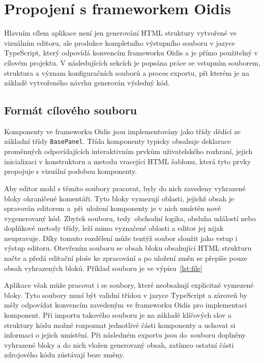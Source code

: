 \section{Propojení s frameworkem Oidis}
\label{Propojeni}

Hlavním cílem aplikace není jen generování HTML struktury vytvořené ve vizuálním editoru, ale produkce kompletního výstupního souboru v jazyce TypeScript, který odpovídá konvencím frameworku Oidis a je přímo použitelný v cílovém projektu. V následujících sekcích je popsána práce se vstupním souborem, struktura a význam konfiguračních souborů a proces exportu, při kterém je na základě vytvořeného návrhu generován výsledný kód.

\subsection{Formát cílového souboru}

Komponenty ve frameworku Oidis jsou implementovány jako třídy dědící ze základní třídy \texttt{BasePanel}. Třída komponenty typicky obsahuje deklarace proměnných odpovídajících interaktivním prvkům uživatelského rozhraní, jejich inicializaci 
v konstruktoru a metodu vracející HTML šablonu, která tyto prvky propojuje s vizuální podobou komponenty.

Aby editor mohl s těmito soubory pracovat, byly do nich zavedeny vyhrazené bloky ohraničené komentáři. Tyto bloky vymezují oblasti, jejichž obsah je spravován editorem a~při~uložení komponenty je v nich umístěn nově vygenerovaný kód. Zbytek souboru, tedy~obchodní logika, obsluha událostí nebo doplňkové metody třídy, leží mimo vyznačené oblasti a editor jej nijak neupravuje. Díky tomuto rozdělení může tentýž soubor sloužit jako vstup i výstup editoru. Otevřením souboru se obsah bloku obsahující HTML strukturu načte a předá editační ploše ke zpracování a po uložení změn se přepíše pouze obsah vyhrazených bloků. Příklad souboru je ve výpisu~\ref{lst:file}

Aplikace však může pracovat i se soubory, které neobsahují explicitně vymezené bloky. Tyto soubory musí být validní třídou v jazyce TypeScript a zároveň by měly odpovídat konvencím zavedeným ve frameworku Oidis pro implementaci komponent. Při importu takového souboru je na základě klíčových slov a struktury kódu možné rozpoznat jednotlivé části komponenty a uchovat si informaci o jejich umístění. Při následném exportu jsou do~souboru doplněny vyhrazené bloky a do nich vložen generovaný obsah, zatímco ostatní části zdrojového kódu zůstávají beze změny.

